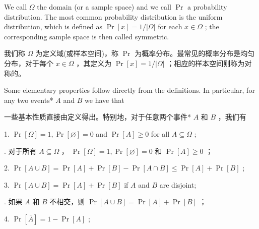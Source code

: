 \documentclass[10pt]{article}
\begin{document}
We call \(\Omega\) the domain (or a sample space) and we call \(\Pr\) a probability distribution. The most common probability distribution is the uniform distribution, which is defined as \(\Pr \left\lbrack  x\right\rbrack   = 1/\left| \Omega \right|\) for each \(x \in  \Omega\) ; the corresponding sample space is then called symmetric.

\begin{tcolorbox}\relax
我们称 \(\Omega\) 为定义域(或样本空间)，称 \(\Pr\) 为概率分布。最常见的概率分布是均匀分布，对于每个 \(x \in  \Omega\) ，其定义为 \(\Pr \left\lbrack  x\right\rbrack   = 1/\left| \Omega \right|\) ；相应的样本空间则称为对称的。
\end{tcolorbox}

Some elementary properties follow directly from the definitions. In particular, for any two events* \(A\) and \(B\) we have that

\begin{tcolorbox}\relax
一些基本性质直接由定义得出。特别地，对于任意两个事件* \(A\) 和 \(B\) ，我们有
\end{tcolorbox}

1. \(\Pr \left\lbrack  \Omega \right\rbrack   = 1,\Pr \left\lbrack  \varnothing \right\rbrack   = 0\) and \(\Pr \left\lbrack  A\right\rbrack   \geq  0\) for all \(A \subseteq  \Omega\) ;

\begin{tcolorbox}. 对于所有 \(A \subseteq  \Omega\) ， \(\Pr \left\lbrack  \Omega \right\rbrack   = 1,\Pr \left\lbrack  \varnothing \right\rbrack   = 0\) 和 \(\Pr \left\lbrack  A\right\rbrack   \geq  0\) ；
\end{tcolorbox}

2. \(\Pr \left\lbrack  {A \cup  B}\right\rbrack   = \Pr \left\lbrack  A\right\rbrack   + \Pr \left\lbrack  B\right\rbrack   - \Pr \left\lbrack  {A \cap  B}\right\rbrack   \leq  \Pr \left\lbrack  A\right\rbrack   + \Pr \left\lbrack  B\right\rbrack\) ;

3. \(\Pr \left\lbrack  {A \cup  B}\right\rbrack   = \Pr \left\lbrack  A\right\rbrack   + \Pr \left\lbrack  B\right\rbrack\) if \(A\) and \(B\) are disjoint;

\begin{tcolorbox}. 如果 \(A\) 和 \(B\) 不相交，则 \(\Pr \left\lbrack  {A \cup  B}\right\rbrack   = \Pr \left\lbrack  A\right\rbrack   + \Pr \left\lbrack  B\right\rbrack\) ；
\end{tcolorbox}

4. \(\Pr \left\lbrack  \bar{A}\right\rbrack   = 1 - \Pr \left\lbrack  A\right\rbrack\) ;
\end{document}
